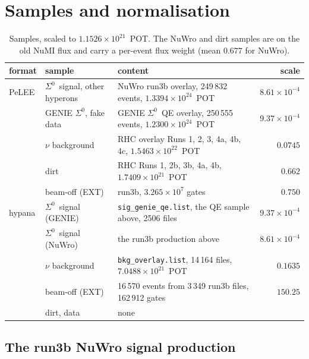 \documentclass[11pt,a4paper]{article}
\newcommand{\Szero}{\ensuremath{\Sigma^{0}}}
\begin{document}
\section{Samples and normalisation}
\label{sec:samples}

\begin{table}[h]\centering
\caption{Samples, scaled to $1.1526\times10^{21}$~POT. The NuWro and dirt samples are
on the old NuMI flux and carry a per-event flux weight (mean $0.677$ for NuWro).}
\label{tab:samples}
\small
\begin{tabular}{llp{}r}
\toprule
format & sample & content & scale \\
\midrule
PeLEE & \Szero\ signal, other hyperons & NuWro run3b overlay, 249\,832 events, $1.3394\times10^{24}$~POT & $8.61\times10^{-4}$ \\
      & GENIE \Szero, fake data & GENIE \Szero\ QE overlay, 250\,555 events, $1.2300\times10^{24}$~POT & $9.37\times10^{-4}$ \\
      & $\nu$ background & RHC overlay Runs 1, 2, 3, 4a, 4b, 4c, $1.5463\times10^{22}$~POT & $0.0745$ \\
      & dirt & RHC Runs 1, 2b, 3b, 4a, 4b, $1.7409\times10^{21}$~POT & $0.662$ \\
      & beam-off (EXT) & run3b, $3.265\times10^{7}$ gates & $0.750$ \\
\midrule
hypana & \Szero\ signal (GENIE) & \texttt{sig\_genie\_qe.list}, the QE sample above, 2506 files & $9.37\times10^{-4}$ \\
       & \Szero\ signal (NuWro) & the run3b production above & $8.61\times10^{-4}$ \\
       & $\nu$ background & \texttt{bkg\_overlay.list}, 14\,164 files, $7.0488\times10^{21}$~POT & $0.1635$ \\
       & beam-off (EXT) & 16\,570 events from 3\,349 run3b files, 162\,912 gates & $150.25$ \\
       & dirt, data & none & \\
\bottomrule
\end{tabular}
\end{table}

\subsection{The run3b NuWro signal production}
\end{document}
